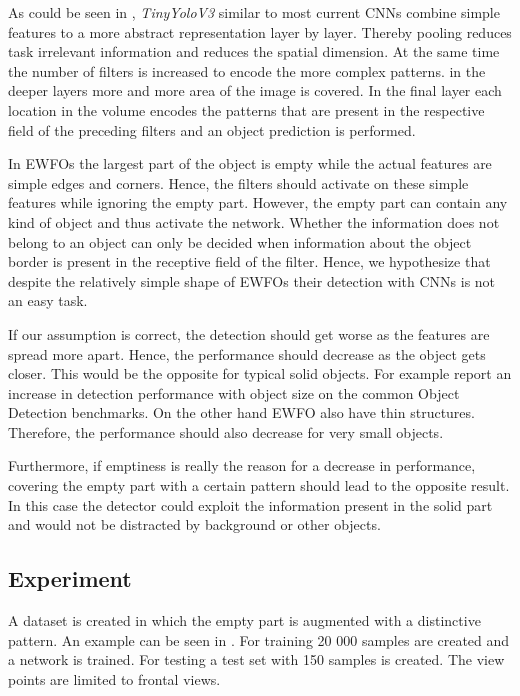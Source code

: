 	As could be seen in , \textit{TinyYoloV3} similar to most current \acp{CNN} combine simple features to a more abstract representation layer by layer. Thereby pooling reduces task irrelevant information and reduces the spatial dimension. At the same time the number of filters is increased to encode the more complex patterns. in the deeper layers more and more area of the image is covered. In the final layer each location in the volume encodes the patterns that are present in the respective field of the preceding filters and an object prediction is performed.
	
	In \acp{EWFO} the largest part of the object is empty while the actual features are simple edges and corners. Hence, the filters should activate on these simple features while ignoring the empty part. However, the empty part can contain any kind of object and thus activate the network. Whether the information does not belong to an object can only be decided when information about the object border is present in the receptive field of the filter. Hence, we hypothesize that despite the relatively simple shape of \acp{EWFO} their detection with \acp{CNN} is not an easy task.
	
	If our assumption is correct, the detection should get worse as the features are spread more apart. Hence, the performance should decrease as the object gets closer. This would be the opposite for typical solid objects. For example  report an increase in detection performance with object size on the common Object Detection benchmarks. On the other hand \ac{EWFO} also have thin structures. Therefore, the performance should also decrease for very small objects.
	
	Furthermore, if emptiness is really the reason for a decrease in performance, covering the empty part with a certain pattern should lead to the opposite result. In this case the detector could exploit the information present in the solid part and would not be distracted by background or other objects.
	
	\subsection{Experiment}
	
	A dataset is created in which the empty part is augmented with a distinctive pattern. An example can be seen in . For training 20 000 samples are created and a network is trained. For testing a test set with 150 samples is created. The view points are limited to frontal views. 
	
